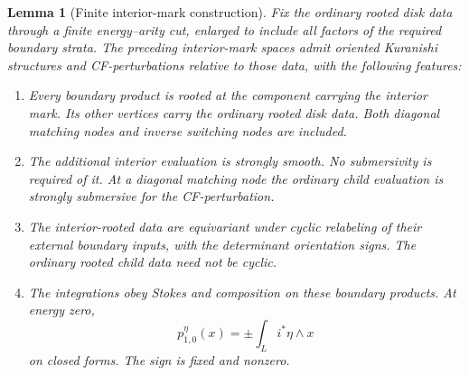 \documentclass[11pt]{article}
\numberwithin{equation}{section}
\newtheorem{lemma}[theorem]{Lemma}
\theoremstyle{definition}
\theoremstyle{remark}
\begin{document}
\begin{lemma}[Finite interior-mark construction]
 \label{lem:interior-construction}
Fix the ordinary rooted disk data through a finite energy--arity cut,
enlarged to include all factors of the required boundary strata.
The preceding interior-mark spaces admit oriented Kuranishi structures
and CF-perturbations relative to those data, with the following features:
\begin{enumerate}[label=(\roman*)]
 \item Every boundary product is rooted at the component carrying the
 interior mark.  Its other vertices carry the ordinary rooted disk
 data.  Both diagonal matching nodes and inverse switching nodes are
 included.
 \item The additional interior evaluation is strongly smooth.  No
 submersivity is required of it.  At a diagonal matching node the
 ordinary child evaluation is strongly submersive for the
 CF-perturbation.
 \item The interior-rooted data are equivariant under cyclic relabeling
 of their external boundary inputs, with the determinant orientation
 signs.  The ordinary rooted child data need not be cyclic.
 \item The integrations obey Stokes and composition on these boundary
 products.  At energy zero,
 \begin{equation}
  \label{eq:floer-p-leading}
  p^\eta_{1,0}(x)=\pm\int_L i^*\eta\wedge x
 \end{equation}
 on closed forms.  The sign is fixed and nonzero.
\end{enumerate}
\end{lemma}
\end{document}
